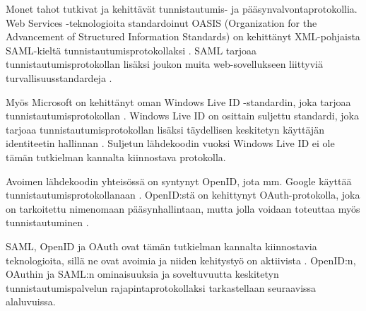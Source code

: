 Monet tahot tutkivat ja kehittävät tunnistautumis- ja pääsynvalvontaprotokollia. Web Services -teknologioita standardoinut OASIS (Organization for the Advancement of Structured Information Standards) on kehittänyt XML-pohjaista SAML-kieltä tunnistautumisprotokollaksi \cite{saml_spec}. SAML tarjoaa tunnistautumisprotokollan lisäksi joukon muita web-sovellukseen liittyviä tur\-val\-li\-suus\-stan\-dar\-de\-ja \cite{next_saml}.

Myös Microsoft on kehittänyt oman Windows Live ID -standardin, joka tarjoaa tunnistautumisprotokollan \cite{open_identity}. Windows Live ID on osittain suljettu standardi, joka tarjoaa tunnistautumisprotokollan lisäksi täydellisen keskitetyn käyttäjän identiteetin hallinnan \cite{open_identity}. Suljetun lähdekoodin vuoksi Windows Live ID ei ole tämän tutkielman kannalta kiinnostava protokolla.

Avoimen lähdekoodin yhteisössä on syntynyt OpenID, jota mm. Google käyttää tunnistautumisprotokollanaan \cite{open_identity}. OpenID:stä on kehittynyt OAuth-pro\-to\-kol\-la, joka on tarkoitettu nimenomaan pääsynhallintaan, mutta jolla voidaan toteuttaa myös tunnistautuminen \cite{formal_oauth}.

SAML, OpenID ja OAuth ovat tämän tutkielman kannalta kiinnostavia teknologioita, sillä ne ovat avoimia ja niiden kehitystyö on aktiivista \cite{facebook}. OpenID:n, OAuthin ja SAML:n ominaisuuksia ja soveltuvuutta keskitetyn tunnistautumispalvelun rajapintaprotokollaksi tarkastellaan seuraavissa alaluvuissa.